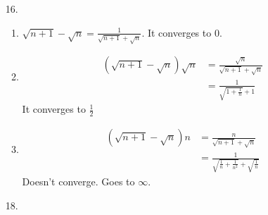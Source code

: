 \documentclass{article}
\begin{document}
\begin{itemize}
\begin{proof}
    \begin{equation*}
      \begin{split}
        \lim_{n\rightarrow \infty}a_n &= \lim_{n \rightarrow \infty} (1-\frac{1}{n+1})\\
        &= 1 - \lim_{n \rightarrow \infty}\frac{1}{n+1}\\
        &= 1 - 0\\
        &= 1
      \end{split}
    \end{equation*}
    As for why $\frac{1}{n+1}$ converges to $0$, that's because it is
a subsequence of $\frac{1}{n}$. I don't remember the theorem being
shown in class, but it can be easily proved with the definition of peak terms.
  \end{proof}
\item [16.]
  \begin{enumerate}[label=\alph*.]
  \item $\sqrt{n+1}-\sqrt{n} = \frac{1}{\sqrt{n+1}+\sqrt{n}}$. It
    converges to $0$.
  \item
    \begin{equation*}
      \begin{split}
        (\sqrt{n+1}-\sqrt{n})\sqrt{n} &=
        \frac{\sqrt{n}}{\sqrt{n+1}+\sqrt{n}}\\
        &= \frac{1}{\sqrt{1+\frac{1}{n}}+1}
      \end{split}
    \end{equation*}
    It converges to $\frac{1}{2}$
  \item
    \begin{equation*}
      \begin{split}
        (\sqrt{n+1}-\sqrt{n})n
        &= \frac{n}{\sqrt{n+1}+\sqrt{n}}\\
        &= \frac{1}{\sqrt{\frac{1}{n}+\frac{1}{n^2}} + \sqrt{\frac{1}{n}}}
      \end{split}
    \end{equation*}
    Doesn't converge. Goes to $\infty$.
  \end{enumerate}
\item [18.]
  
\end{itemize}
\end{document}
